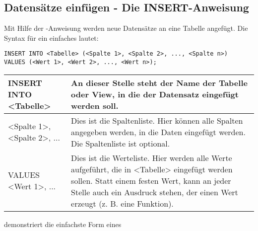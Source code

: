       \subsection{Datensätze einfügen - Die INSERT-Anweisung}
        Mit Hilfe der \INSERT-Anweisung werden neue Datensätze an eine Tabelle
        angefügt. Die Syntax für ein einfaches \INSERT lautet:
        \begin{lstlisting}[language=oracle_sql,caption={Die INSERT Anweisungen},label=sql07_01]
INSERT INTO <Tabelle> (<Spalte 1>, <Spalte 2>, ..., <Spalte n>)
VALUES (<Wert 1>, <Wert 2>, ..., <Wert n>);
        \end{lstlisting}
        \begin{center}
          \label{insertsyntax}
          \begin{small}
            \tabletail{
              \hline
            }
            \tablelasttail{
              \hline
            }
            \begin{supertabular}{|l|p{10.8cm}|}
              INSERT INTO <Tabelle> & An dieser Stelle steht der Name der
              Tabelle oder View, in die der Datensatz eingefügt werden soll.
              \\
              \hline
              <Spalte 1>, <Spalte 2>, ... & Dies ist die Spaltenliste. Hier
              können alle Spalten angegeben werden, in die Daten eingefügt
              werden. Die Spaltenliste ist optional. \\
              \hline
              VALUES <Wert 1>, ... & Dies ist die Werteliste. Hier werden alle
              Werte aufgeführt, die in <Tabelle> eingefügt werden sollen.
              Statt einem festen Wert, kann an jeder Stelle auch ein Ausdruck
              stehen, der einen Wert erzeugt (z. B. eine Funktion). \\
            \end{supertabular}
          \end{small}
        \end{center}
         demonstriert die einfachste Form eines

